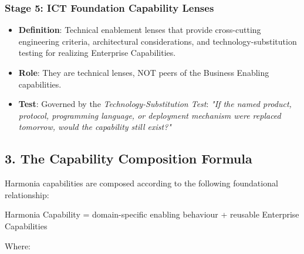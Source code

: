 \label{rad:tier-model:137}
\subsubsection*{Stage 5: ICT Foundation Capability Lenses}
\label{rad:tier-model:138}

\begin{itemize}

\item 
\textbf{Definition}: Technical enablement lenses that provide cross-cutting engineering criteria, architectural considerations, and technology-substitution testing for realizing Enterprise Capabilities.



\item 
\textbf{Role}: They are technical lenses, NOT peers of the Business Enabling capabilities.



\item 
\textbf{Test}: Governed by the \emph{Technology-Substitution Test}: \emph{"If the named product, protocol, programming language, or deployment mechanism were replaced tomorrow, would the capability still exist?"}



\end{itemize}
\label{rad:tier-model:142}

\par\smallskip
{}\label{rad:tier-model:144}
\subsection*{3. The Capability Composition Formula}
\label{rad:tier-model:146}

Harmonia capabilities are composed according to the following foundational relationship:

\label{rad:tier-model:148}

 Harmonia Capability = domain-specific enabling behaviour + reusable Enterprise Capabilities

\label{rad:tier-model:150}

Where:

\label{rad:tier-model:151}

